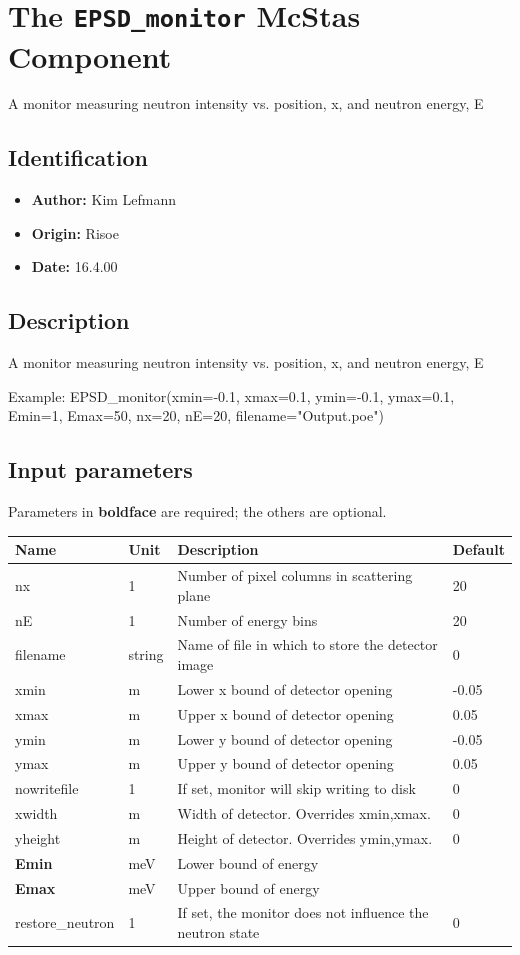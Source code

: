 \section{The \texttt{EPSD\_monitor} McStas Component}
A monitor measuring neutron intensity vs. position, x, and neutron energy, E

\subsection*{Identification}
\begin{itemize}
  \item \textbf{Author:} Kim Lefmann
  \item \textbf{Origin:} Risoe
  \item \textbf{Date:} 16.4.00
\end{itemize}

\subsection*{Description}
A monitor measuring neutron intensity vs. position, x, and neutron energy, E

Example: EPSD\_monitor(xmin=-0.1, xmax=0.1, ymin=-0.1, ymax=0.1, Emin=1, Emax=50, nx=20, nE=20, filename="Output.poe")

\subsection*{Input parameters}
Parameters in \textbf{boldface} are required; the others are optional.

\begin{longtable}{p{}p{}p{}p{}}
\toprule
\textbf{Name} & \textbf{Unit} & \textbf{Description} & \textbf{Default} \\
\midrule
\endhead
nx & 1 & Number of pixel columns in scattering plane & 20 \\
nE & 1 & Number of energy bins & 20 \\
filename & string & Name of file in which to store the detector image & 0 \\
xmin & m & Lower x bound of detector opening & -0.05 \\
xmax & m & Upper x bound of detector opening & 0.05 \\
ymin & m & Lower y bound of detector opening & -0.05 \\
ymax & m & Upper y bound of detector opening & 0.05 \\
nowritefile & 1 & If set, monitor will skip writing to disk & 0 \\
xwidth & m & Width of detector. Overrides xmin,xmax. & 0 \\
yheight & m & Height of detector. Overrides ymin,ymax. & 0 \\
\textbf{Emin} & meV & Lower bound of energy &  \\
\textbf{Emax} & meV & Upper bound of energy &  \\
restore\_neutron & 1 & If set, the monitor does not influence the neutron state & 0 \\
\bottomrule
\end{longtable}

